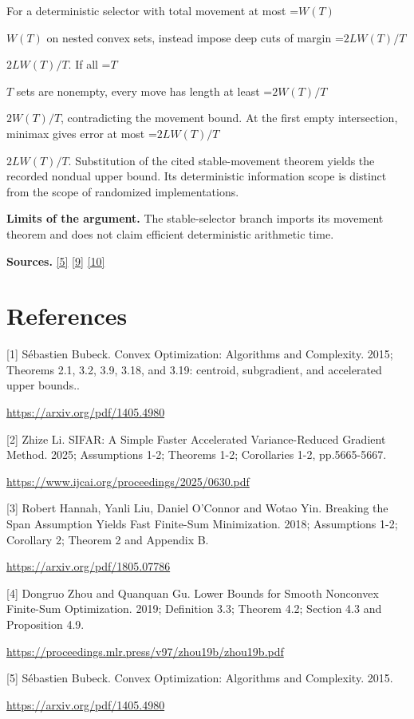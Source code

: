 \documentclass[10pt,a4paper]{article}
\newcommand{\AtlasMath}[1]{\par\begingroup\centering\setbox0=\hbox{$\displaystyle #1$}\ifdim\wd0>1.4\linewidth\typeout{ATLAS WIDE FORMULA: \the\wd0}\fi\ifdim\wd0>\linewidth\resizebox{\linewidth}{!}{\box0}\else\box0\fi\par\endgroup}
\newcommand{\AtlasInlineMath}[1]{\begingroup\setbox0=\hbox{$#1$}\ifdim\wd0>.4\linewidth\endgroup\AtlasMath{#1}\else\endgroup$#1$\fi}
\begin{document}
For a deterministic selector with total movement at most \AtlasInlineMath{W(T)} on nested convex sets, instead impose deep cuts of margin \AtlasInlineMath{2LW(T)/T}. If all \AtlasInlineMath{T} sets are nonempty, every move has length at least \AtlasInlineMath{2W(T)/T}, contradicting the movement bound. At the first empty intersection, minimax gives error at most \AtlasInlineMath{2LW(T)/T}. Substitution of the cited stable-movement theorem yields the recorded nondual upper bound. Its deterministic information scope is distinct from the scope of randomized implementations.

\textbf{Limits of the argument.} The stable-selector branch imports its movement theorem and does not claim efficient deterministic arithmetic time.

\textbf{Sources.} \href{https://arxiv.org/pdf/1405.4980}{[5]} \href{https://www2.isye.gatech.edu/~nemirovs/MOR_AccuracyCertificates.pdf}{[9]} \href{https://arxiv.org/pdf/2609.20701}{[10]}

\section{References}
[1] Sébastien Bubeck. Convex Optimization: Algorithms and Complexity. 2015; Theorems 2.1, 3.2, 3.9, 3.18, and 3.19: centroid, subgradient, and accelerated upper bounds..

\url{https://arxiv.org/pdf/1405.4980}

[2] Zhize Li. SIFAR: A Simple Faster Accelerated Variance-Reduced Gradient Method. 2025; Assumptions 1-2; Theorems 1-2; Corollaries 1-2, pp.5665-5667.

\url{https://www.ijcai.org/proceedings/2025/0630.pdf}

[3] Robert Hannah, Yanli Liu, Daniel O'Connor and Wotao Yin. Breaking the Span Assumption Yields Fast Finite-Sum Minimization. 2018; Assumptions 1-2; Corollary 2; Theorem 2 and Appendix B.

\url{https://arxiv.org/pdf/1805.07786}

[4] Dongruo Zhou and Quanquan Gu. Lower Bounds for Smooth Nonconvex Finite-Sum Optimization. 2019; Definition 3.3; Theorem 4.2; Section 4.3 and Proposition 4.9.

\url{https://proceedings.mlr.press/v97/zhou19b/zhou19b.pdf}

[5] Sébastien Bubeck. Convex Optimization: Algorithms and Complexity. 2015.

\url{https://arxiv.org/pdf/1405.4980}
\end{document}
